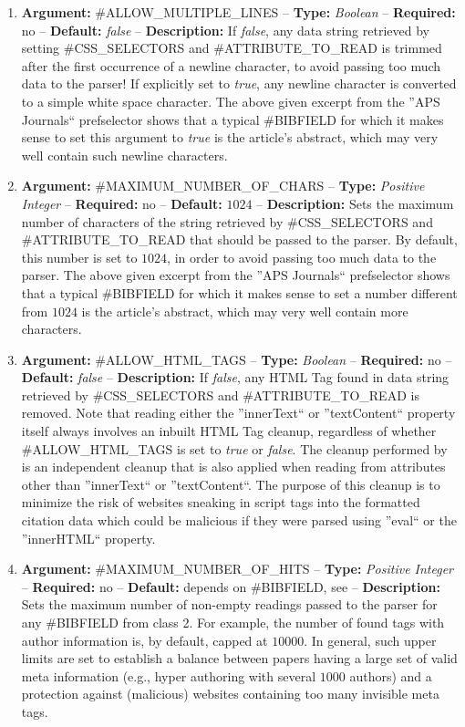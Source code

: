 \documentclass[
a4paper,
12pt,
]
{article}
\begin{document}
\begin{enumerate}
\item \textbf{Argument:} \#ALLOW\_MULTIPLE\_LINES -- \textbf{Type:} \textit{Boolean} -- \textbf{Required:} no -- \textbf{Default:} \textit{false} --  \textbf{Description:} If \textit{false}, any data string retrieved by setting \#CSS\_SELECTORS and \#ATTRIBUTE\_TO\_READ is trimmed after the first occurrence of a newline character, to avoid passing too much data to the parser! If explicitly set to \textit{true}, any newline character is converted to a simple white space character.
The above given excerpt from the ''APS Journals`` prefselector shows that a typical \#BIBFIELD for which it makes sense to set this argument to \textit{true} is the article's abstract, which may very well contain such newline characters. 

\item \textbf{Argument:} \#MAXIMUM\_NUMBER\_OF\_CHARS -- \textbf{Type:} \textit{Positive Integer} -- \textbf{Required:} no -- \textbf{Default:} $1024$ --  \textbf{Description:} Sets the maximum number of characters of the string retrieved by \#CSS\_SELECTORS and \#ATTRIBUTE\_TO\_READ that should be passed to the parser. By default, this number is set to $1024$, in order to avoid passing too much data to the parser. 
The above given excerpt from the ''APS Journals`` prefselector shows that a typical \#BIBFIELD for which it makes sense to set a number different from $1024$ is the article's abstract, which may very well contain more characters. 

\item \textbf{Argument:} \#ALLOW\_HTML\_TAGS -- \textbf{Type:} \textit{Boolean} -- \textbf{Required:} no -- \textbf{Default:} \textit{false} --  \textbf{Description:} If \textit{false}, any HTML Tag found in data string retrieved by \#CSS\_SELECTORS and \#ATTRIBUTE\_TO\_READ is removed. Note that reading either the ''innerText`` or ''textContent`` property itself always involves an inbuilt HTML Tag cleanup, regardless of whether \#ALLOW\_HTML\_TAGS is set to \textit{true} or \textit{false}. 
The cleanup performed by {\plgname} is an independent cleanup that is also applied when reading from attributes other than ''innerText`` or ''textContent``. The purpose of this cleanup is to minimize the risk of websites sneaking in script tags into the formatted citation data which could be malicious if they were parsed using ''eval`` or the ''innerHTML`` property.

\item \textbf{Argument:} \#MAXIMUM\_NUMBER\_OF\_HITS -- \textbf{Type:} \textit{Positive Integer} -- \textbf{Required:} no -- \textbf{Default:} depends on \#BIBFIELD, see  --  \textbf{Description:} Sets the maximum number of non-empty readings passed to the parser for any \#BIBFIELD from class 2. For example, the number of found tags with author information is, by default, capped at $10000$. 
In general, such upper limits are set to establish a balance between papers having a large set of valid meta information (e.g., hyper authoring with several $1000$ authors) and a protection against (malicious) websites containing too many invisible meta tags. 

\end{enumerate}
\end{document}
